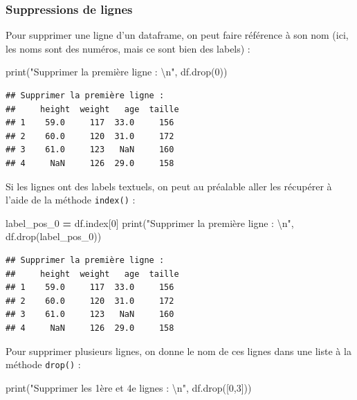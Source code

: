 \documentclass[
  12pt,
]{book}
\newenvironment{Shaded}{\begin{snugshade}}{\end{snugshade}}
\newcommand{\BuiltInTok}[1]{#1}
\newcommand{\CharTok}[1]{\textcolor[rgb]{0.31,0.60,0.02}{#1}}
\newcommand{\DecValTok}[1]{\textcolor[rgb]{0.00,0.00,0.81}{#1}}
\newcommand{\NormalTok}[1]{#1}
\newcommand{\OperatorTok}[1]{\textcolor[rgb]{0.81,0.36,0.00}{\textbf{#1}}}
\newcommand{\StringTok}[1]{\textcolor[rgb]{0.31,0.60,0.02}{#1}}
\numberwithin{equation}{section}
\numberwithin{countremarque}{section}
\begin{document}
\subsubsection{Suppressions de lignes}\label{suppressions-de-lignes}

Pour supprimer une ligne d'un dataframe, on peut faire référence à son nom (ici, les noms sont des numéros, mais ce sont bien des labels) :

\begin{Shaded}
\begin{Highlighting}[]
\BuiltInTok{print}\NormalTok{(}\StringTok{"Supprimer la première ligne :  }\CharTok{\textbackslash{}n}\StringTok{"}\NormalTok{, df.drop(}\DecValTok{0}\NormalTok{))}
\end{Highlighting}
\end{Shaded}

\begin{lstlisting}
## Supprimer la première ligne :  
##     height  weight   age  taille
## 1    59.0     117  33.0     156
## 2    60.0     120  31.0     172
## 3    61.0     123   NaN     160
## 4     NaN     126  29.0     158
\end{lstlisting}

Si les lignes ont des labels textuels, on peut au préalable aller les récupérer à l'aide de la méthode \texttt{index()} :

\begin{Shaded}
\begin{Highlighting}[]
\NormalTok{label\_pos\_0 }\OperatorTok{=}\NormalTok{ df.index[}\DecValTok{0}\NormalTok{]}
\BuiltInTok{print}\NormalTok{(}\StringTok{"Supprimer la première ligne :  }\CharTok{\textbackslash{}n}\StringTok{"}\NormalTok{, df.drop(label\_pos\_0))}
\end{Highlighting}
\end{Shaded}

\begin{lstlisting}
## Supprimer la première ligne :  
##     height  weight   age  taille
## 1    59.0     117  33.0     156
## 2    60.0     120  31.0     172
## 3    61.0     123   NaN     160
## 4     NaN     126  29.0     158
\end{lstlisting}

Pour supprimer plusieurs lignes, on donne le nom de ces lignes dans une liste à la méthode \texttt{drop()} :

\begin{Shaded}
\begin{Highlighting}[]
\BuiltInTok{print}\NormalTok{(}\StringTok{"Supprimer les 1ère et 4e lignes :  }\CharTok{\textbackslash{}n}\StringTok{"}\NormalTok{, df.drop([}\DecValTok{0}\NormalTok{,}\DecValTok{3}\NormalTok{]))}
\end{Highlighting}
\end{Shaded}
\end{document}
